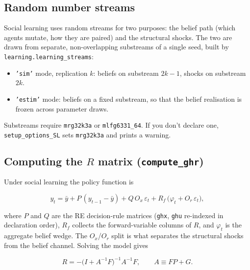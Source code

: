 \documentclass[11pt,a4paper]{article}
\newcommand{\field}[1]{\texttt{#1}}
\begin{document}
\subsection{Random number streams}
\label{sec:simulation:rng}

Social learning uses random streams for two purposes: the belief path (which
agents mutate, how they are paired) and the structural shocks. The two are
drawn from separate, non-overlapping substreams of a single seed, built by
\texttt{learning.learning\_streams}:

\begin{itemize}[leftmargin=2em]
\item \texttt{'sim'} mode, replication $k$: beliefs on substream $2k-1$, shocks
      on substream $2k$. 
\item \texttt{'estim'} mode: beliefs on a fixed substream, so that the belief
      realisation is frozen across parameter draws.
\end{itemize}

Substreams require \texttt{mrg32k3a} or \texttt{mlfg6331\_64}. If you don't declare one, \texttt{setup\_options\_SL} sets \texttt{mrg32k3a} and prints a
warning.


\subsection{Computing the $R$ matrix (\texttt{compute\_ghr})}
\label{sec:simulation:compute_ghr}

Under social learning the policy function is

\begin{equation}
\label{eq:policy}
y_t = \bar{y} + P\,(y_{t-1} - \bar{y})
      + Q\,O_x\,\varepsilon_t
      + R_f\,\bigl(\varphi_t + O_r\,\varepsilon_t\bigr),
\end{equation}

where $P$ and $Q$ are the RE decision-rule matrices (\field{ghx},
\field{ghu} re-indexed in declaration order), $R_f$ collects the
forward-variable columns of $R$, and $\varphi_t$ is the aggregate belief wedge.
The $O_x$/$O_r$ split is what separates the structural shocks from the belief
channel.
\noindent
Solving the model gives

\begin{equation}
R = -\bigl(I + A^{-1}F\bigr)^{-1} A^{-1} F,
\qquad A \equiv F P + G .
\end{equation}
\end{document}
